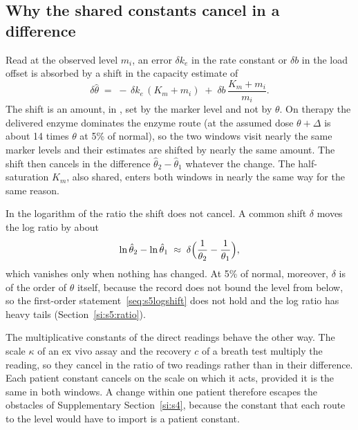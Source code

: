 \subsection{Why the shared constants cancel in a difference}
\label{si:s5:cancel}

Read at the observed level $m_i$, an error $\delta k_e$ in the rate constant or $\delta b$ in
the load offset is absorbed by a shift in the capacity estimate of
\begin{equation}
\label{seq:s5shift}
\delta\hat\theta\;=\;-\,\delta k_e\,(K_m+m_i)\;+\;\delta b\,\frac{K_m+m_i}{m_i}.
\end{equation}
The shift is an amount, in \um, set by the marker level and not by $\theta$. On therapy the
delivered enzyme dominates the enzyme route (at the assumed dose $\theta+\Delta$ is about 14
times $\theta$ at 5\% of normal), so the two windows visit nearly the same marker levels and
their estimates are shifted by nearly the same amount. The shift then cancels in the difference
$\hat\theta_2-\hat\theta_1$ whatever the change. The half-saturation $K_m$, also shared, enters
both windows in nearly the same way for the same reason.

In the logarithm of the ratio the shift does not cancel. A common shift $\delta$ moves the log
ratio by about
\begin{equation}
\label{seq:s5logshift}
\ln\hat\theta_2-\ln\hat\theta_1\;\approx\;\delta\Bigl(\frac{1}{\theta_2}-\frac{1}{\theta_1}\Bigr),
\end{equation}
which vanishes only when nothing has changed. At 5\% of normal, moreover, $\delta$ is of the
order of $\theta$ itself, because the record does not bound the level from below, so the
first-order statement~\eqref{seq:s5logshift} does not hold and the log ratio has heavy tails
(Section~\ref{si:s5:ratio}).

The multiplicative constants of the direct readings behave the other way. The scale $\kappa$ of
an ex vivo assay and the recovery $c$ of a breath test multiply the reading, so they cancel in
the ratio of two readings rather than in their difference. Each patient constant cancels on the
scale on which it acts, provided it is the same in both windows. A change within one patient
therefore escapes the obstacles of Supplementary Section~\ref{si:s4}, because the constant that
each route to the level would have to import is a patient constant.

